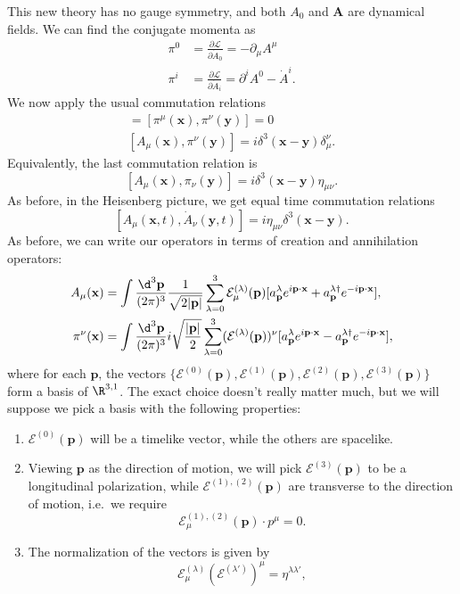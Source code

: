 \documentclass[a4paper]{article}
\begin{document}
This new theory has no gauge symmetry, and both $A_0$ and $\mathbf{A}$ are dynamical fields. We can find the conjugate momenta as
\begin{align*}
  \pi^0 &= \frac{\partial\mathcal{L}}{\partial \dot{A}_0} = - \partial_\mu A^\mu\\
  \pi^i &= \frac{\partial \mathcal{L}}{\partial \dot{A}_i} = \partial^i A^0 - \dot{A}^i.
\end{align*}
We now apply the usual commutation relations
\begin{gather*}
  [A_\mu (\mathbf{x}), A_\nu(\mathbf{y})] = [\pi^\mu(\mathbf{x}), \pi^\nu(\mathbf{y})] = 0\\
  [A_\mu(\mathbf{x}), \pi^\nu(\mathbf{y})] = i\delta^3(\mathbf{x} - \mathbf{y}) \delta_\mu^\nu.
\end{gather*}
Equivalently, the last commutation relation is
\[
  [A_\mu(\mathbf{x}), \pi_\nu(\mathbf{y})] = i\delta^3(\mathbf{x} - \mathbf{y}) \eta_{\mu\nu}.
\]
As before, in the Heisenberg picture, we get equal time commutation relations
\[
  [A_\mu (\mathbf{x}, t), \dot{A}_\nu(\mathbf{y}, t)] = i\eta_{\mu\nu} \delta^3(\mathbf{x} - \mathbf{y}).
\]
As before, we can write our operators in terms of creation and annihilation operators:
\begin{align*}
  A_\mu(\mathbf{x}) &= \int \frac{\d^3 \mathbf{p}}{(2\pi)^3} \frac{1}{\sqrt{2 |\mathbf{p}|}} \sum_{\lambda = 0}^3 \mathcal{E}_\mu^{(\lambda)}(\mathbf{p}) [a_\mathbf{p}^\lambda e^{i\mathbf{p}\cdot \mathbf{x}} + a_\mathbf{p}^{\lambda\dagger} e^{-i\mathbf{p}\cdot \mathbf{x}}],\\
  \pi^\nu(\mathbf{x}) &= \int \frac{\d^3 \mathbf{p}}{(2\pi)^3} i\sqrt{\frac{|\mathbf{p}|}{2}} \sum_{\lambda = 0}^3 (\mathcal{E}^{(\lambda)}(\mathbf{p}))^\nu [a_\mathbf{p}^\lambda e^{i\mathbf{p}\cdot \mathbf{x}} - a_\mathbf{p}^{\lambda\dagger} e^{-i\mathbf{p}\cdot \mathbf{x}}],
\end{align*}
where for each $\mathbf{p}$, the vectors $\{\mathcal{E}^{(0)}(\mathbf{p}), \mathcal{E}^{(1)}(\mathbf{p}), \mathcal{E}^{(2)}(\mathbf{p}), \mathcal{E}^{(3)}(\mathbf{p})\}$ form a basis of $\R^{3, 1}$. The exact choice doesn't really matter much, but we will suppose we pick a basis with the following properties:
\begin{enumerate}
  \item $\mathcal{E}^{(0)}(\mathbf{p})$ will be a timelike vector, while the others are spacelike.
  \item Viewing $\mathbf{p}$ as the direction of motion, we will pick $\mathcal{E}^{(3)}(\mathbf{p})$ to be a longitudinal polarization, while $\mathcal{E}^{(1),(2)}(\mathbf{p})$ are transverse to the direction of motion, i.e.\ we require
    \[
      \mathcal{E}^{(1), (2)}_\mu(\mathbf{p}) \cdot p^\mu = 0.
    \]
  \item The normalization of the vectors is given by
    \[
      \mathcal{E}^{(\lambda)}_\mu (\mathcal{E}^{(\lambda')})^\mu = \eta^{\lambda\lambda'},
    \]
\end{enumerate}
\end{document}
